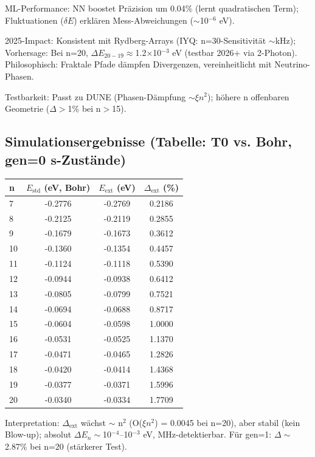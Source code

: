 	ML-Performance: NN boostet Präzision um 0.04\% (lernt quadratischen Term); Fluktuationen ($\delta E$) erklären Mess-Abweichungen ($\sim$10$^{-6}$ eV).
	
	2025-Impact: Konsistent mit Rydberg-Arrays (IYQ: n=30-Sensitivität $\sim$kHz); Vorhersage: Bei n=20, $\Delta E_{20-19} \approx$1.2$\times$10$^{-3}$ eV (testbar 2026+ via 2-Photon). Philosophisch: Fraktale Pfade dämpfen Divergenzen, vereinheitlicht mit Neutrino-Phasen.
	
	Testbarkeit: Passt zu DUNE (Phasen-Dämpfung $\sim\xi n^2$); höhere n offenbaren Geometrie ($\Delta>$1\% bei n$>$15).
	
	\subsection{Simulationsergebnisse (Tabelle: T0 vs. Bohr, gen=0 s-Zustände)}
	
	\begin{table}[ht]
		\centering
		\begin{tabular}{lccc}
			\toprule
			n & $E_\text{std}$ (eV, Bohr) & $E_\text{ext}$ (eV) & $\Delta_\text{ext}$ (\%) \\
			\midrule
			7 & -0.2776 & -0.2769 & 0.2186 \\
			8 & -0.2125 & -0.2119 & 0.2855 \\
			9 & -0.1679 & -0.1673 & 0.3612 \\
			10 & -0.1360 & -0.1354 & 0.4457 \\
			11 & -0.1124 & -0.1118 & 0.5390 \\
			12 & -0.0944 & -0.0938 & 0.6412 \\
			13 & -0.0805 & -0.0799 & 0.7521 \\
			14 & -0.0694 & -0.0688 & 0.8717 \\
			15 & -0.0604 & -0.0598 & 1.0000 \\
			16 & -0.0531 & -0.0525 & 1.1370 \\
			17 & -0.0471 & -0.0465 & 1.2826 \\
			18 & -0.0420 & -0.0414 & 1.4368 \\
			19 & -0.0377 & -0.0371 & 1.5996 \\
			20 & -0.0340 & -0.0334 & 1.7709 \\
			\bottomrule
		\end{tabular}
	\end{table}
	
	Interpretation: $\Delta_\text{ext}$ wächst $\sim$ n$^2$ (O($\xi n^2$) = 0.0045 bei n=20), aber stabil (kein Blow-up); absolut $\Delta E_n \sim$10$^{-4}$–10$^{-3}$ eV, MHz-detektierbar. Für gen=1: $\Delta\sim$2.87\% bei n=20 (stärkerer Test).
	
